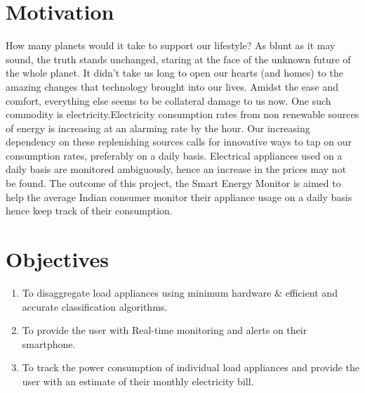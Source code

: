 \section {Motivation}
How many planets would it take to support our lifestyle? As blunt as it may sound, the truth stands unchanged, staring at the face of the unknown future of the whole planet. It didn't take us long to open our hearts (and homes) to the amazing changes that technology brought into our lives. Amidst the ease and comfort, everything else seems to be collateral damage to us now. One such commodity is electricity.Electricity consumption rates from non renewable sources of energy is increasing at an alarming rate by the hour. Our increasing dependency on these replenishing  sources calls for innovative ways to tap on our consumption rates, preferably on a daily basis. Electrical appliances used on a daily basis are monitored ambiguously, hence an increase in the prices may not be found. 
The outcome of this project, the Smart Energy Monitor is aimed to help the average Indian consumer monitor their appliance usage on a daily basis hence keep track of their consumption.

\section{Objectives}
\begin{enumerate}
	\item To disaggregate load appliances using minimum hardware & efficient and accurate classification algorithms.
	\item To provide the user with Real-time monitoring and alerts on their smartphone.
	\item To track the power consumption of individual load appliances and provide the user with an estimate of their monthly electricity bill.
\end{enumerate}